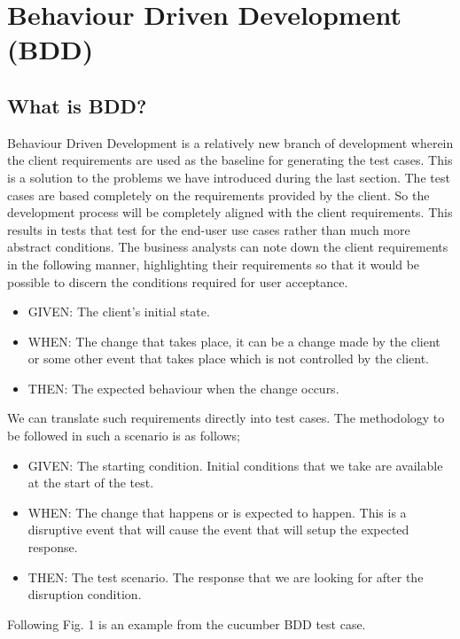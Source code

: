 \documentclass[conference]{IEEEtran}
\begin{document}
\section{Behaviour Driven Development (BDD)}
\subsection{What is BDD?}
Behaviour Driven Development is a relatively new branch of development wherein the client requirements are used as the baseline for generating the test cases. This is a solution to the problems we have introduced during the last section. The test cases are based completely on the requirements provided by the client. So the development process will be completely aligned with the client requirements. This results in tests that test for the end-user use cases rather than much more abstract conditions.\newline
The business analysts can note down the client requirements in the following manner, highlighting their requirements so that it would be possible to discern the conditions required for user acceptance.
\begin{itemize}
	\item GIVEN: The client's initial state.
	\item WHEN: The change that takes place, it can be a change made by the client or some other event that takes place which is not controlled by the client.
	\item THEN: The expected behaviour when the change occurs.
\end{itemize}
We can translate such requirements directly into test cases. The methodology to be followed in such a scenario is as follows;
\begin{itemize}
	\item GIVEN: The starting condition. Initial conditions that we take are available at the start of the test.
	\item WHEN: The change that happens or is expected to happen. This is a disruptive event that will cause the event that will setup the expected response.
	\item THEN: The test scenario. The response that we are looking for after the disruption condition.
\end{itemize}

Following Fig. 1 is an example from the cucumber BDD test case.
\end{document}
